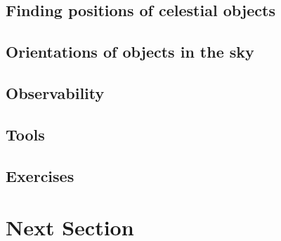 \documentclass[12pt]{article}
\begin{document}
\subsection*{Finding positions of celestial objects}
\subsection*{Orientations of objects in the sky}
\subsection*{Observability}
\subsection*{Tools}
\subsection*{Exercises}

\newpage
\section*{Next Section}

\end{document}

